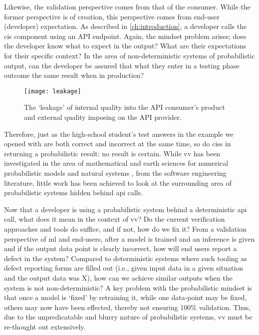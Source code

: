 Likewise, the validation perspective comes from that of the consumer. While the former perspective is of creation, this perspective comes from end-user (developer) expectation. As described in \cref{ch:introduction}, a developer calls the \gls{cis} component using an API endpoint. Again, the mindset problem arises; does the developer know what to expect in the output? What are their expectations for their specific context? In the area of non-deterministic systems of probabilistic output, can the developer be assured that what they enter in a testing phase outcome the same result when in production?

\begin{figure}[hbt]
  \centering
  \texttt{[image: leakage]}
  \caption[Leakage of internal and external quality in CISs]{The `leakage' of internal quality into the API consumer's product and external quality imposing on the API provider.}
  \label{fig:background:software-quality:v-and-v:leakage}
\end{figure}

Therefore, just as the high-school student's test answers in the example we opened with are both correct and incorrect at the same time, so do \glspl{cis} in returning a probabilistic result: no result is certain. While \gls{vv} has been investigated in the area of mathematical and earth sciences for numerical probabilistic models and natural systems \citep{Oreskes:1994gn,Rutten:2004a}, from the software engineering literature, little work has been achieved to look at the surrounding area of probabilistic systems hidden behind \gls{api} calls. 

Now that a developer is using  a probabilistic system behind a deterministic \gls{api} call, what does it mean in the context of \gls{vv}? Do the current verification approaches and tools do suffice, and if not, how do we fix it? From a validation perspective of \gls{ml} and end-users, after a model is trained and an inference is given and if the output data point is clearly incorrect, how will end users report a defect in the system? Compared to deterministic systems where such tooling as defect reporting forms are filled out (i.e., given input data in a given situation and the output data was X), how can we achieve similar outputs when the system is not non-deterministic? A key problem with the probabilistic mindset is that once a model is `fixed' by retraining it, while one data-point may be fixed, others may now have been effected, thereby not ensuring 100\% validation. Thus, due to the unpredicatable and blurry nature of probabilistic systems, \gls{vv} must be re-thought out extensively.

